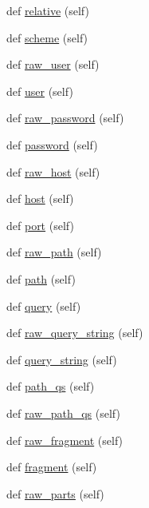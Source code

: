 \begin{DoxyCompactItemize}
\item 
def \hyperlink{classyarl_1_1_u_r_l_aa009b6726f5eaa1eef87e4bcafe03518}{relative} (self)
\item 
def \hyperlink{classyarl_1_1_u_r_l_a8b60f8bedeae832f0a6b829d51f67d72}{scheme} (self)
\item 
def \hyperlink{classyarl_1_1_u_r_l_aebb2d210fe53976ee878560d86a0061a}{raw\+\_\+user} (self)
\item 
def \hyperlink{classyarl_1_1_u_r_l_ab04fc87f41bbf84de1c3af564afa6e2f}{user} (self)
\item 
def \hyperlink{classyarl_1_1_u_r_l_a1391b195c4999384e89b4f399a20b978}{raw\+\_\+password} (self)
\item 
def \hyperlink{classyarl_1_1_u_r_l_a634441286d0daca5528ba5f48373ac21}{password} (self)
\item 
def \hyperlink{classyarl_1_1_u_r_l_a4a92cf50fec13ea6bca92e97c604bdc2}{raw\+\_\+host} (self)
\item 
def \hyperlink{classyarl_1_1_u_r_l_ae650199d67e0c5092c25b22c14caed54}{host} (self)
\item 
def \hyperlink{classyarl_1_1_u_r_l_a2bed00dab0bfcc9bcdfe9d472a4a445d}{port} (self)
\item 
def \hyperlink{classyarl_1_1_u_r_l_aeb54b14de2c6e6ace3455602e92ea1f3}{raw\+\_\+path} (self)
\item 
def \hyperlink{classyarl_1_1_u_r_l_ad0f8dd2dcbe14c8e29084f73148b584e}{path} (self)
\item 
def \hyperlink{classyarl_1_1_u_r_l_a10122ffc37115834b1e40e10b92f24cc}{query} (self)
\item 
def \hyperlink{classyarl_1_1_u_r_l_a5b3ce1d94b6a97d7b7c10206e4a2e5bb}{raw\+\_\+query\+\_\+string} (self)
\item 
def \hyperlink{classyarl_1_1_u_r_l_ae0c2703179536721d215c1fb7f46b82e}{query\+\_\+string} (self)
\item 
def \hyperlink{classyarl_1_1_u_r_l_a56caa87073c917e7dd92b5c244940696}{path\+\_\+qs} (self)
\item 
def \hyperlink{classyarl_1_1_u_r_l_a70320d1f58f06dc5f01bc96a21544ea4}{raw\+\_\+path\+\_\+qs} (self)
\item 
def \hyperlink{classyarl_1_1_u_r_l_a5f0396ee0d1c7b899d8fbc110d34b73e}{raw\+\_\+fragment} (self)
\item 
def \hyperlink{classyarl_1_1_u_r_l_a50c3724e1a627325be8f496cda2f613b}{fragment} (self)
\item 
def \hyperlink{classyarl_1_1_u_r_l_a9fcc938e6c9cef3442d2087945ee8e61}{raw\+\_\+parts} (self)

\end{DoxyCompactItemize}
